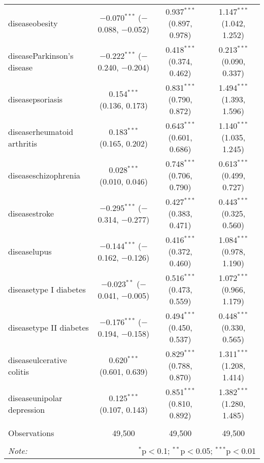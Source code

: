\begin{table}[!htbp]
\begin{tabular}{@{\extracolsep{5pt}}lccc}
  diseaseobesity & $-$0.070$^{***}$ ($-$0.088, $-$0.052) & 0.937$^{***}$ (0.897, 0.978) & 1.147$^{***}$ (1.042, 1.252) \\ 
  diseaseParkinson's disease & $-$0.222$^{***}$ ($-$0.240, $-$0.204) & 0.418$^{***}$ (0.374, 0.462) & 0.213$^{***}$ (0.090, 0.337) \\ 
  diseasepsoriasis & 0.154$^{***}$ (0.136, 0.173) & 0.831$^{***}$ (0.790, 0.872) & 1.494$^{***}$ (1.393, 1.596) \\ 
  diseaserheumatoid arthritis & 0.183$^{***}$ (0.165, 0.202) & 0.643$^{***}$ (0.601, 0.686) & 1.140$^{***}$ (1.035, 1.245) \\ 
  diseaseschizophrenia & 0.028$^{***}$ (0.010, 0.046) & 0.748$^{***}$ (0.706, 0.790) & 0.613$^{***}$ (0.499, 0.727) \\ 
  diseasestroke & $-$0.295$^{***}$ ($-$0.314, $-$0.277) & 0.427$^{***}$ (0.383, 0.471) & 0.443$^{***}$ (0.325, 0.560) \\ 
  diseaselupus & $-$0.144$^{***}$ ($-$0.162, $-$0.126) & 0.416$^{***}$ (0.372, 0.460) & 1.084$^{***}$ (0.978, 1.190) \\ 
  diseasetype I diabetes & $-$0.023$^{**}$ ($-$0.041, $-$0.005) & 0.516$^{***}$ (0.473, 0.559) & 1.072$^{***}$ (0.966, 1.179) \\ 
  diseasetype II diabetes & $-$0.176$^{***}$ ($-$0.194, $-$0.158) & 0.494$^{***}$ (0.450, 0.537) & 0.448$^{***}$ (0.330, 0.565) \\ 
  diseaseulcerative colitis & 0.620$^{***}$ (0.601, 0.639) & 0.829$^{***}$ (0.788, 0.870) & 1.311$^{***}$ (1.208, 1.414) \\ 
  diseaseunipolar depression & 0.125$^{***}$ (0.107, 0.143) & 0.851$^{***}$ (0.810, 0.892) & 1.382$^{***}$ (1.280, 1.485) \\ 
 \hline \\[-1.8ex] 
Observations & 49,500 & 49,500 & 49,500 \\ 
\hline 
\hline \\[-1.8ex] 
\textit{Note:}  & \multicolumn{3}{r}{$^{*}$p$<$0.1; $^{**}$p$<$0.05; $^{***}$p$<$0.01} \\ 
\end{tabular} 
\end{table} 
